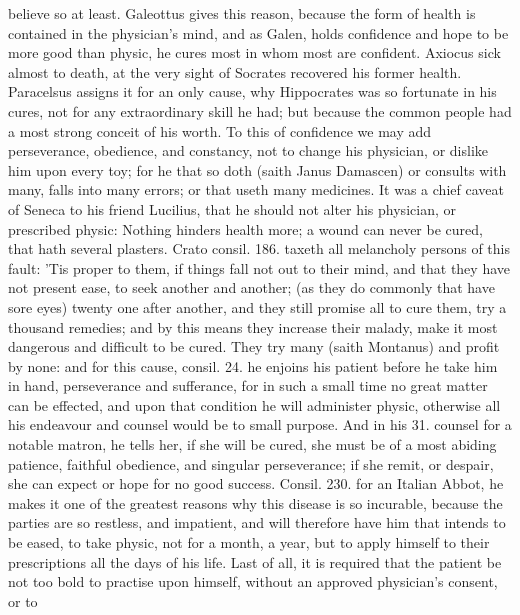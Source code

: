 {believe so at least. Galeottus gives this reason, because the
form of health is contained in the physician's mind, and as Galen,
holds confidence and hope to be more good than physic, he cures
most in whom most are confident. Axiocus sick almost to death, at the
very sight of Socrates recovered his former health. Paracelsus assigns
it for an only cause, why Hippocrates was so fortunate in his cures,
not for any extraordinary skill he had; but because the common
people had a most strong conceit of his worth. To this of confidence we
may add perseverance, obedience, and constancy, not to change his
physician, or dislike him upon every toy; for he that so doth (saith
Janus Damascen) or consults with many, falls into many errors; or
that useth many medicines. It was a chief caveat of Seneca to his
friend Lucilius, that he should not alter his physician, or prescribed
physic: Nothing hinders health more; a wound can never be cured, that
hath several plasters. Crato consil. 186. taxeth all melancholy persons
of this fault: 'Tis proper to them, if things fall not out to
their mind, and that they have not present ease, to seek another and
another; (as they do commonly that have sore eyes) twenty one after
another, and they still promise all to cure them, try a thousand
remedies; and by this means they increase their malady, make it most
dangerous and difficult to be cured. They try many (saith 
Montanus) and profit by none: and for this cause, consil. 24. he
enjoins his patient before he take him in hand, perseverance and
sufferance, for in such a small time no great matter can be effected,
and upon that condition he will administer physic, otherwise all his
endeavour and counsel would be to small purpose. And in his 31. counsel
for a notable matron, he tells her, if she will be cured, she
must be of a most abiding patience, faithful obedience, and singular
perseverance; if she remit, or despair, she can expect or hope for no
good success. Consil. 230. for an Italian Abbot, he makes it one of the
greatest reasons why this disease is so incurable, because the
parties are so restless, and impatient, and will therefore have him
that intends to be eased, to take physic, not for a month, a
year, but to apply himself to their prescriptions all the days of his
life. Last of all, it is required that the patient be not too bold to
practise upon himself, without an approved physician's consent, or to
}
